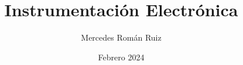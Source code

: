 \documentclass[10pt, a4paper, twoside, twocolumn]{book}
\title{Instrumentación Electrónica}
\author{Mercedes Román Ruiz}
\date{Febrero 2024}
\theoremstyle{definition}
\begin{document}
\sloppy 
\setlength{\parindent}{30pt}
\setlength{\parskip}{6pt}
\renewcommand\thesection{\arabic{section}}
\renewcommand{\baselinestretch}{1.5}
\renewcommand{\listtablename}{Índice de tablas} %
\renewcommand{\tablename}{Tabla} %
\renewcommand{\baselinestretch}{1.5}

\fancyhead{}
\fancyfoot{}
\pagestyle{fancy}
\chead[\rightmark]{\leftmark}

\fancyfoot[LE,RO]{\thepage}

%

%

%



\nocite{*}
\printbibliography
\end{document}
